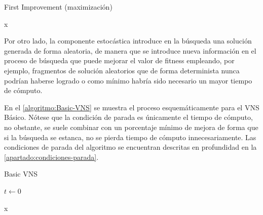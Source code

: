 \begin{algorithm}[htbp]
    \caption{First Improvement (maximización)}
    \label{algoritmo:FirstImprovement}

    \DontPrintSemicolon
    \medskip

    \Return x \;

\end{algorithm}

Por otro lado, la componente estocástica introduce en la búsqueda una solución generada de forma aleatoria, de manera que se introduce nueva información en el proceso de búsqueda que puede mejorar el valor de fitness empleando, por ejemplo, fragmentos de solución aleatorios que de forma determinista nunca podrían haberse logrado o como mínimo habría sido necesario un mayor tiempo de cómputo.

En el \autoref{algoritmo:Basic-VNS} se muestra el proceso esquemáticamente para el VNS Básico. Nótese que la condición de parada es únicamente el tiempo de cómputo, no obstante, se suele combinar con un porcentaje mínimo de mejora de forma que si la búsqueda se estanca, no se pierda tiempo de cómputo innecesariamente. Las condiciones de parada del algoritmo se encuentran descritas en profundidad en la \autoref{apartado:condiciones-parada}.

\begin{algorithm}[htbp]
	\caption[Basic VNS]{Basic VNS~\cite{vns}}
	\label{algoritmo:Basic-VNS}
	
	\DontPrintSemicolon

	\bigskip
	
	$t \leftarrow 0$ \;
	
	
	\Return x \;
	
\end{algorithm}

